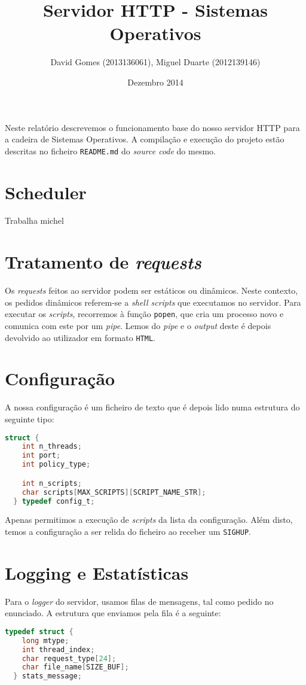 \documentclass[12pt]{article}
\title{Servidor HTTP - Sistemas Operativos}
\author{David Gomes (2013136061), Miguel Duarte (2012139146)}
\date{Dezembro 2014}
\begin{document}
\maketitle

Neste relatório descrevemos o funcionamento base do nosso servidor HTTP
para a cadeira de Sistemas Operativos. A compilação e execução do projeto
estão descritas no ficheiro \texttt{README.md} do \textit{source code} do
mesmo.

\section{Scheduler}
Trabalha michel

\section{Tratamento de \textit{requests}}
Os \textit{requests} feitos ao servidor podem ser estáticos ou dinâmicos. Neste
contexto, os pedidos dinâmicos referem-se a \textit{shell scripts} que executamos
no servidor. Para executar os \textit{scripts}, recorremos à função
\texttt{popen}, que cria um processo novo e comunica com este por um \textit{pipe}.
Lemos do \textit{pipe} e o \textit{output} deste é depois devolvido ao utilizador
em formato \texttt{HTML}.

\section{Configuração}
A nossa configuração é um ficheiro de texto que é depois lido numa estrutura
do seguinte tipo:

\vspace{2mm}
\begin{lstlisting}[language=C]
  struct {
    int n_threads;
    int port;
    int policy_type;

    int n_scripts;
    char scripts[MAX_SCRIPTS][SCRIPT_NAME_STR];
  } typedef config_t;
\end{lstlisting}

Apenas permitimos a execução de \textit{scripts} da lista da configuração. Além disto,
temos a configuração a ser relida do ficheiro ao receber um \texttt{SIGHUP}.

\section{Logging e Estatísticas}
Para o \textit{logger} do servidor, usamos filas de mensagens, tal como pedido
no enunciado. A estrutura que enviamos pela fila é a seguinte:

\vspace{2mm}
\begin{lstlisting}[language=C]
  typedef struct {
    long mtype;
    int thread_index;
    char request_type[24];
    char file_name[SIZE_BUF];
  } stats_message;
\end{lstlisting}
\end{document}
